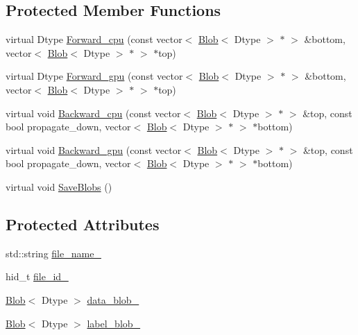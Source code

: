 \subsection*{Protected Member Functions}
\begin{DoxyCompactItemize}
\item 
virtual Dtype \hyperlink{classcaffe_1_1_h_d_f5_output_layer_a91f77d8f66e4de8280e681f9155b20fa}{Forward\+\_\+cpu} (const vector$<$ \hyperlink{classcaffe_1_1_blob}{Blob}$<$ Dtype $>$ $\ast$ $>$ \&bottom, vector$<$ \hyperlink{classcaffe_1_1_blob}{Blob}$<$ Dtype $>$ $\ast$ $>$ $\ast$top)
\item 
virtual Dtype \hyperlink{classcaffe_1_1_h_d_f5_output_layer_a9f78145efc3bb9ecc7d6a78a3e9c3856}{Forward\+\_\+gpu} (const vector$<$ \hyperlink{classcaffe_1_1_blob}{Blob}$<$ Dtype $>$ $\ast$ $>$ \&bottom, vector$<$ \hyperlink{classcaffe_1_1_blob}{Blob}$<$ Dtype $>$ $\ast$ $>$ $\ast$top)
\item 
virtual void \hyperlink{classcaffe_1_1_h_d_f5_output_layer_a805cc611664761d199b5eb54ba20de0c}{Backward\+\_\+cpu} (const vector$<$ \hyperlink{classcaffe_1_1_blob}{Blob}$<$ Dtype $>$ $\ast$ $>$ \&top, const bool propagate\+\_\+down, vector$<$ \hyperlink{classcaffe_1_1_blob}{Blob}$<$ Dtype $>$ $\ast$ $>$ $\ast$bottom)
\item 
virtual void \hyperlink{classcaffe_1_1_h_d_f5_output_layer_a2018b7ab2f08f004bf967b177e1bb724}{Backward\+\_\+gpu} (const vector$<$ \hyperlink{classcaffe_1_1_blob}{Blob}$<$ Dtype $>$ $\ast$ $>$ \&top, const bool propagate\+\_\+down, vector$<$ \hyperlink{classcaffe_1_1_blob}{Blob}$<$ Dtype $>$ $\ast$ $>$ $\ast$bottom)
\item 
virtual void \hyperlink{classcaffe_1_1_h_d_f5_output_layer_a56c7ba8e69d0867d550dddd928863a2f}{Save\+Blobs} ()
\end{DoxyCompactItemize}
\subsection*{Protected Attributes}
\begin{DoxyCompactItemize}
\item 
std\+::string \hyperlink{classcaffe_1_1_h_d_f5_output_layer_aa4609affd7a57ba7481b98afed3f7985}{file\+\_\+name\+\_\+}
\item 
hid\+\_\+t \hyperlink{classcaffe_1_1_h_d_f5_output_layer_a353a5e36b3baa08e381dc5da1bb8b74e}{file\+\_\+id\+\_\+}
\item 
\hyperlink{classcaffe_1_1_blob}{Blob}$<$ Dtype $>$ \hyperlink{classcaffe_1_1_h_d_f5_output_layer_ad91a29d84d4f7c577adf1b634fec1d92}{data\+\_\+blob\+\_\+}
\item 
\hyperlink{classcaffe_1_1_blob}{Blob}$<$ Dtype $>$ \hyperlink{classcaffe_1_1_h_d_f5_output_layer_aef72be0097ab1894a5414b74512e3807}{label\+\_\+blob\+\_\+}
\end{DoxyCompactItemize}


